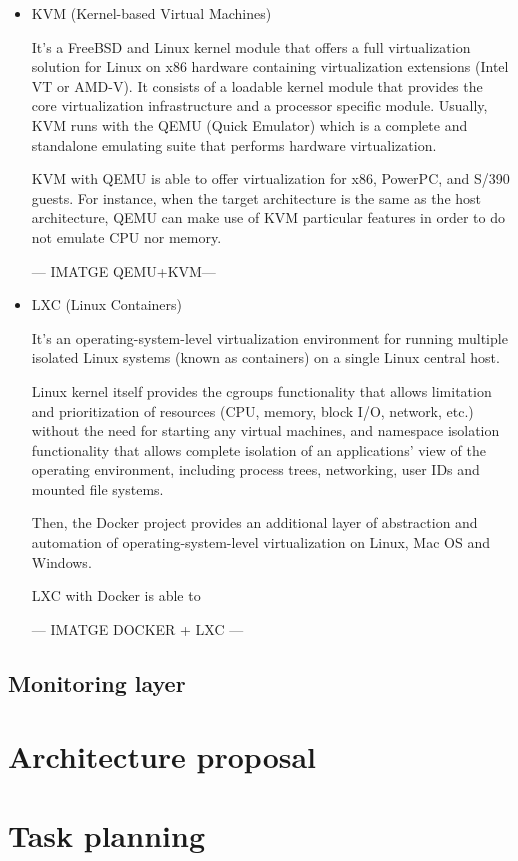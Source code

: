 \begin{itemize}
\item KVM (Kernel-based Virtual Machines) \hfill

It's a FreeBSD and Linux kernel module that offers a full virtualization solution for Linux on x86 hardware containing virtualization extensions (Intel VT or AMD-V). It consists of a loadable kernel module that provides the core virtualization infrastructure and a processor specific module.
Usually, KVM runs with the QEMU (Quick Emulator) which is a complete and standalone emulating suite that performs hardware virtualization.

KVM with QEMU is able to offer virtualization for x86, PowerPC, and S/390 guests. For instance, when the target architecture is the same as the host architecture, QEMU can make use of KVM particular features in order to do not emulate CPU nor memory.

--- IMATGE QEMU+KVM---

\item LXC (Linux Containers) \hfill

It's an operating-system-level virtualization environment for running multiple isolated Linux systems (known as containers) on a single Linux central host.

Linux kernel itself provides the cgroups functionality that allows limitation and prioritization of resources (CPU, memory, block I/O, network, etc.) without the need for starting any virtual machines, and namespace isolation functionality that allows complete isolation of an applications' view of the operating environment, including process trees, networking, user IDs and mounted file systems.

Then, the Docker project provides an additional layer of abstraction and automation of operating-system-level virtualization on Linux, Mac OS and Windows.

LXC with Docker is able to 

--- IMATGE DOCKER + LXC ---
\end{itemize}


\subsection{Monitoring layer}
\section{Architecture proposal}
\section{Task planning}



